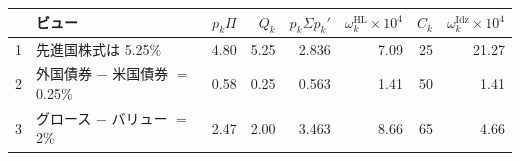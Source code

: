 \begin{tabular}{clrrrrrr}
\toprule
 & ビュー & $p_k\Pi$ & $Q_k$ & $p_k\Sigma p_k'$ & $\omega_k^{\mathrm{HL}}\times10^4$ & $C_k$ & $\omega_k^{\mathrm{Idz}}\times10^4$ \\
\midrule
1 & 先進国株式は 5.25\% & 4.80 & 5.25 & 2.836 & 7.09 & 25 & 21.27 \\
2 & 外国債券 $-$ 米国債券 $=$ 0.25\% & 0.58 & 0.25 & 0.563 & 1.41 & 50 & 1.41 \\
3 & グロース $-$ バリュー $=$ 2\% & 2.47 & 2.00 & 3.463 & 8.66 & 65 & 4.66 \\
\bottomrule
\end{tabular}
